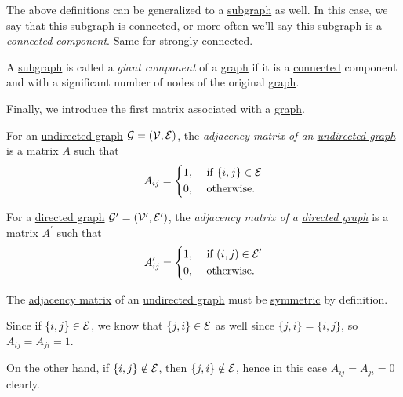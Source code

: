\begin{notation}
	The above definitions can be generalized to a \hyperref[def:subgraph]{subgraph} as well. In this case, we say that this \hyperref[def:subgraph]{subgraph} is \hyperref[def:connected]{connected}, or more often we'll say this \hyperref[def:subgraph]{subgraph} is a \emph{\hyperref[def:connected]{connected} \hyperref[def:subgraph]{component}}. Same for \hyperref[def:strongly-connected]{strongly connected}.
\end{notation}

\begin{definition}\label{def:giant-component}
	A \hyperref[def:subgraph]{subgraph} is called a \emph{giant component} of a \hyperref[def:graph]{graph} if it is a \hyperref[def:connected]{connected} component and with a significant number of nodes of the original \hyperref[def:graph]{graph}.
\end{definition}

Finally, we introduce the first matrix associated with a \hyperref[def:graph]{graph}.
\begin{definition}\label{def:adjacency-matrix}
	For an \hyperref[def:undirected-graph]{undirected graph} \(\mathcal{\MakeUppercase{g}} = (\mathcal{\MakeUppercase{v}} , \mathcal{\MakeUppercase{e}} )\), the \emph{adjacency matrix of an \hyperref[def:undirected-graph]{undirected graph}} is a matrix \(A\) such that
	\[
		A_{ij} =\begin{dcases}
			1, & \text{ if }\{i, j\}\in\mathcal{E} \\
			0, & \text{ otherwise.}
		\end{dcases}
	\]

	For a \hyperref[def:directed-graph]{directed graph} \(\mathcal{\MakeUppercase{g}}^\prime = (\mathcal{\MakeUppercase{v}}^\prime , \mathcal{\MakeUppercase{e}}^\prime )\), the \emph{adjacency matrix of a \hyperref[def:directed-graph]{directed graph}} is a matrix \(A^\prime\) such that
	\[
		A^\prime _{ij} = \begin{dcases}
			1, & \text{ if }(i, j)\in\mathcal{E}^\prime \\
			0, & \text{ otherwise.}
		\end{dcases}
	\]
\end{definition}

\begin{remark}
	The \hyperref[def:adjacency-matrix]{adjacency matrix} of an \hyperref[def:undirected-graph]{undirected graph} must be \hyperref[def:symmetric-matrix]{symmetric} by definition.
\end{remark}
\begin{explanation}
	Since if \(\{i, j\}\in \mathcal{\MakeUppercase{e}} \), we know that \(\{j, i\}\in \mathcal{\MakeUppercase{e}} \) as well since \(\{j, i\} = \{i, j\}\), so \(A_{ij} = A_{ji} = 1\).

	On the other hand, if \(\{i, j\}\notin \mathcal{\MakeUppercase{e}} \), then \(\{j, i\}\notin \mathcal{\MakeUppercase{e}} \), hence in this case \(A_{ij} = A_{ji} = 0\) clearly.
\end{explanation}